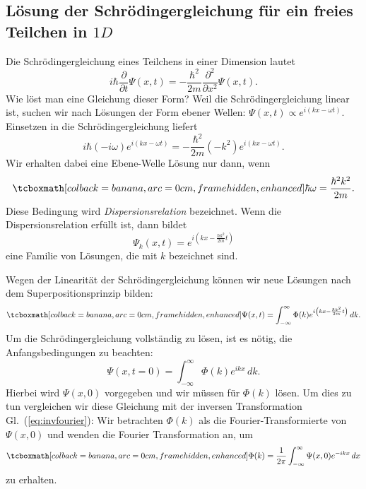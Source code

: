 \subsection{Lösung der Schrödingergleichung für ein freies Teilchen in $1D$}
Die Schrödingergleichung eines Teilchens in einer Dimension lautet
\begin{equation}
	i\hbar\frac{\partial}{\partial t}\Psi(x,t) = -\frac{\hbar^2}{2m}\frac{\partial^2}{\partial x^2}\Psi(x,t).
\end{equation}
Wie löst man eine Gleichung dieser Form? Weil die Schrödingergleichung linear ist, suchen wir nach Lösungen der Form ebener Wellen: $\Psi(x,t) \propto e^{i(kx-\omega t)}$. Einsetzen in die Schrödingergleichung liefert
\begin{equation}
	i\hbar (-i\omega)e^{i(kx-\omega t)} = -\frac{\hbar^2}{2m}(-k^2)e^{i(kx-\omega t)}.
\end{equation}
Wir erhalten dabei eine Ebene-Welle Lösung nur dann, wenn
\begin{equation}
	\eqbox{\hbar\omega = \frac{\hbar^2k^2}{2m}.}
\end{equation} 
Diese Bedingung wird \emph{Dispersionsrelation} bezeichnet. Wenn die Dispersionsrelation erfüllt ist, dann bildet 
\begin{equation}
	\Psi_{k}(x,t) = e^{i\left(kx-\frac{\hbar k^2}{2m} t\right)}
\end{equation}
eine Familie von Lösungen, die mit $k$ bezeichnet sind.

Wegen der Linearität der Schrödingergleichung können wir neue Lösungen nach dem Superpositionsprinzip bilden:
\begin{equation}
	\eqbox{\Psi(x,t) = \int_{-\infty}^{\infty} \Phi(k)e^{i\left(kx-\frac{\hbar k^2}{2m} t\right)}\, dk.}
\end{equation}
Um die Schrödingergleichung vollständig zu lösen, ist es nötig, die Anfangsbedingungen zu beachten:
\begin{equation}
	\Psi(x,t=0) = \int_{-\infty}^{\infty} \Phi(k)e^{ikx}\, dk.
\end{equation}
Hierbei wird $\Psi(x,0)$ vorgegeben und wir müssen für $\Phi(k)$ lösen. Um dies zu tun vergleichen wir diese Gleichung mit der inversen Transformation Gl.~(\ref{eq:invfourier}): Wir betrachten $\Phi(k)$ als die Fourier-Transformierte von $\Psi(x,0)$ und wenden die Fourier Transformation an, um
\begin{equation}
	\eqbox{\Phi(k) = \frac{1}{2\pi}\int_{-\infty}^{\infty} \Psi(x,0)e^{-ikx}\, dx}
\end{equation}
zu erhalten.

